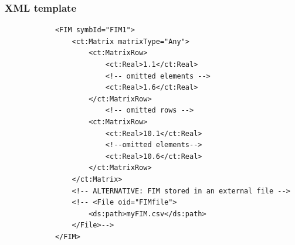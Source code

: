 \subsubsection{XML template}
\lstset{language=XML}
\begin{lstlisting}
            <FIM symbId="FIM1">
                <ct:Matrix matrixType="Any">
                    <ct:MatrixRow>
                        <ct:Real>1.1</ct:Real>
                        <!-- omitted elements -->
                        <ct:Real>1.6</ct:Real>
                    </ct:MatrixRow>
                        <!-- omitted rows -->
                    <ct:MatrixRow>
                        <ct:Real>10.1</ct:Real>
                        <!--omitted elements-->
                        <ct:Real>10.6</ct:Real>
                    </ct:MatrixRow>
                </ct:Matrix>
                <!-- ALTERNATIVE: FIM stored in an external file -->
                <!-- <File oid="FIMfile">
                    <ds:path>myFIM.csv</ds:path>
                </File>-->
            </FIM>
\end{lstlisting}


